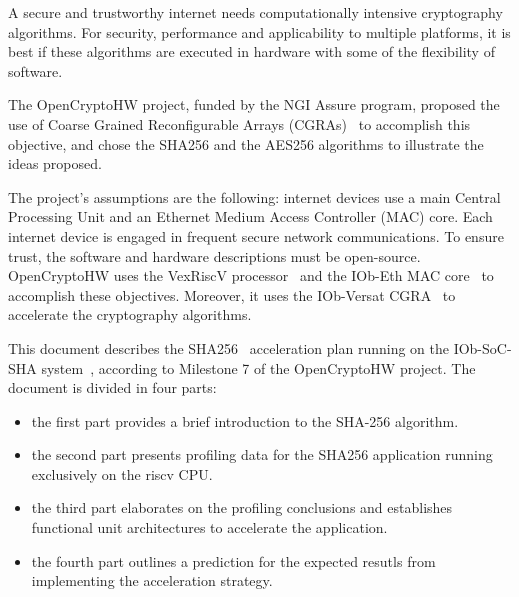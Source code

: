 A secure and trustworthy internet needs computationally intensive cryptography
algorithms. For security, performance and applicability to multiple platforms,
it is best if these algorithms are executed in hardware with some of the
flexibility of software.

The OpenCryptoHW project, funded by the NGI Assure program, proposed the use of
Coarse Grained Reconfigurable Arrays (CGRAs)~\cite{bla} to accomplish this
objective, and chose the SHA256 and the AES256 algorithms to illustrate the
ideas proposed.

The project's assumptions are the following: internet devices use a main Central
Processing Unit and an Ethernet Medium Access Controller (MAC) core. Each
internet device is engaged in frequent secure network communications. To ensure
trust, the software and hardware descriptions must be open-source. OpenCryptoHW
uses the VexRiscV processor~\cite{} and the IOb-Eth MAC core~\cite{iob-eth} to
accomplish these objectives. Moreover, it uses the IOb-Versat
CGRA~\cite{iob-versat} to accelerate the cryptography algorithms.

This document describes the SHA256~\cite{SHA_NIST_FIPS} acceleration plan
running on the IOb-SoC-SHA system~\cite{iob-soc-sha}, according to Milestone 7 of
the OpenCryptoHW project. The document is divided in four parts:
\begin{itemize}
\item the first part provides a brief introduction to the SHA-256 algorithm.
\item the second part presents profiling data for the SHA256 application
    running exclusively on the riscv CPU.
\item the third part elaborates on the profiling conclusions and establishes
    functional unit architectures to accelerate the application.
\item the fourth part outlines a prediction for the expected resutls from
    implementing the acceleration strategy.
\end{itemize}










